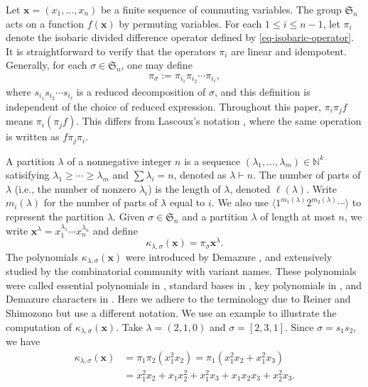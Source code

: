\documentclass[12pt]{article}
\numberwithin{equation}{section}
\begin{document}
Let $\mathbf{x} = (x_1, \ldots, x_n)$ be a finite sequence
of commuting variables. The group $\mathfrak{S}_n$ acts on a function $f(\mathbf{x})$ by permuting variables.  
For each $1\le i\le n-1$, 
let $\pi_i$ denote the isobaric divided difference
operator defined by \eqref{eq-isobaric-operator}.
It is straightforward to verify that the
operators $\pi_i$ are linear and idempotent.  
Generally, for each $\sigma \in \mathfrak{S}_n$, one may define 
\begin{align*}
\pi_\sigma := \pi_{i_1} \pi_{i_2} \cdots \pi_{i_\ell},
\end{align*}
where $s_{i_1} s_{i_2} \cdots s_{i_\ell}$ is a reduced decomposition of $\sigma$, and this definition is independent of the choice of reduced expression. Throughout this paper, $\pi_i\pi_j f$ means $\pi_i(\pi_j f)$. This differs from Lascoux's notation \cite{Lascoux-2016}, where the same operation is written as $f\pi_j\pi_i$.

A partition $\lambda$ of a nonnegative integer $n$ is a sequence $(\lambda_1,\ldots,\lambda_m)\in\mathbb{N}^k$ satisifying $\lambda_1\ge\cdots \ge\lambda_m$ and $\sum \lambda_i=n$, denoted as $\lambda\vdash n$. The number of parts of $\lambda$ (i.e., the number of nonzero $\lambda_i$) is the length of $\lambda$, denoted $\ell(\lambda)$. Write $m_i(\lambda)$ for the number of parts of $\lambda$ equal to $i$. We also use $\langle1^{m_1(\lambda)}2^{m_2(\lambda)}\cdots\rangle$ to represent the partition $\lambda$. Given $\sigma \in \mathfrak{S}_{n}$ and a partition $\lambda$ of length at most $n$, we write
$\textbf{x}^{\lambda}=x_1^{\lambda_1}\cdots x_{n}^{\lambda_n}$ and define
$$
\kappa_{\lambda,\sigma}(\mathbf{x})=\pi_\sigma \textbf{x}^{\lambda}.
$$
The polynomials $\kappa_{\lambda,\sigma}(\mathbf{x})$ were introduced by Demazure \cite{Demazure-1974}, and 
extensively studied by the combinatorial community with variant names. 
These polynomials were called essential polynomials in \cite{Lascoux-Paul-1982}, standard bases in \cite{Lascoux-Paul-1989,Lascoux-Paul-1990}, key polynomials in \cite{Reiner-Shimozono-1995}, and Demazure characters in \cite{Postnikov-Stanley-2008}. Here we adhere to the terminology due to Reiner and Shimozono  \cite{Reiner-Shimozono-1995} but use a different notation.
We use an example to illustrate the computation of $\kappa_{\lambda,\sigma}(\mathbf{x})$. 
Take $\lambda=(2,1,0)$ and $\sigma=[2,3,1]$. Since $\sigma=s_1s_2$, we have
\begin{align*}
\kappa_{\lambda,\sigma}(\mathbf x)&=\pi_1\pi_2(x_1^2x_2)=\pi_1\left(x_1^2x_2+x_1^2x_3\right)\\
&=x_1^2x_2+x_1x_2^2+x_1^2x_3+x_1x_2x_3+x_2^2x_3.
\end{align*}
\end{document}
